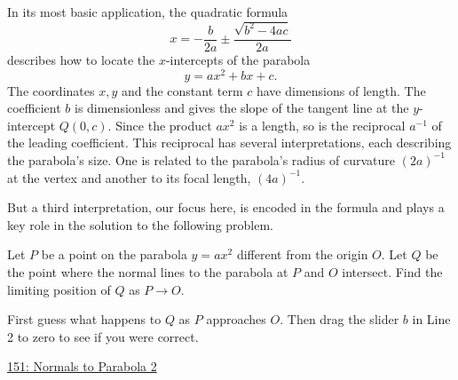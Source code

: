 \documentclass{ximera}
\begin{document}

In its most basic application, the quadratic formula
\[
   x = -\frac{b}{2a}\pm \frac{\sqrt{b^2-4ac}}{2a}
\]
describes how to locate the $x$-intercepts of the parabola 
\begin{equation}
 y=ax^2+bx+c.   \label{Eq:Parabola}
 \end{equation}
 The coordinates $x,y$ and the constant term $c$ have dimensions of length. The coefficient $b$ is dimensionless and gives the slope of the tangent line at the $y$-intercept $Q(0,c)$. Since the product $ax^2$ is a length, so is the reciprocal $a^{-1}$ of the leading coefficient. This reciprocal has several interpretations, each describing the parabola's size. One is related to the parabola's radius of curvature $(2a)^{-1}$ at the vertex and another to its focal length, $(4a)^{-1}$. 

But a third interpretation, our focus here, is encoded in the formula and plays a key role in the solution to the following problem.

\begin{exercise}
Let $P$ be a point on the parabola $y=ax^2$ different from the origin $O$. Let $Q$ be the point where the normal lines to the parabola at $P$ and $O$ intersect. Find the limiting position of $Q$ as $P\to O$.

\begin{exploration}
First guess what happens to $Q$ as $P$ approaches $O$. Then drag the slider $b$ in Line 2 to zero to see if you were correct.
\begin{onlineOnly}
    \begin{center}
\end{center}
\end{onlineOnly}

\href{https://www.desmos.com/calculator/2xaqqvvv7p}{151: Normals to Parabola 2}
\end{exploration}



\end{exercise}
\end{document}
